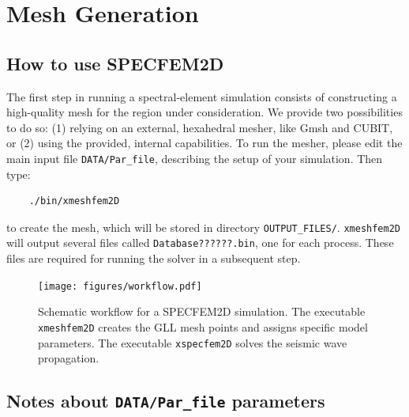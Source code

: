 
\chapter{Mesh Generation}


\section{How to use SPECFEM2D}
The first step in running a spectral-element simulation consists of
constructing a high-quality mesh for the region under consideration.
We provide two possibilities to do so: (1) relying on an external,
hexahedral mesher, like Gmsh and CUBIT, or (2) using the provided, internal capabilities.
To run the mesher, please edit the main input file \texttt{DATA/Par\_file}, describing the setup of your simulation.
Then type:
%
\begin{verbatim}
    ./bin/xmeshfem2D
\end{verbatim}
%
to create the mesh, which will be stored in directory \texttt{OUTPUT\_FILES/}. \texttt{xmeshfem2D} will output several files called \texttt{Database??????.bin}, one for each process. These files are required for running the solver in a subsequent step.
%
\begin{figure}[htbp]
\centering
\texttt{[image: figures/workflow.pdf]}

\caption{Schematic workflow for a SPECFEM2D simulation. The executable \texttt{xmeshfem2D} creates the GLL mesh points and assigns specific model parameters. The executable \texttt{xspecfem2D} solves the seismic wave propagation.}

\label{fig:workflow.databases}
\end{figure}


\section*{Notes about \texttt{DATA/Par\_file} parameters}

